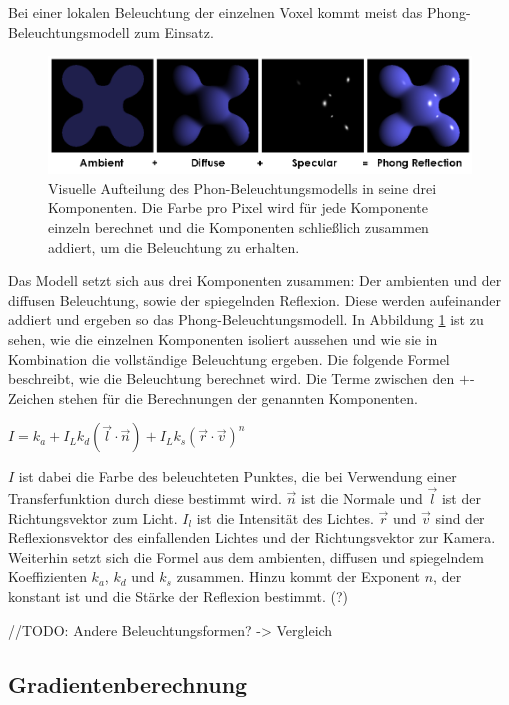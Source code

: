 Bei einer lokalen Beleuchtung der einzelnen Voxel kommt meist das Phong-Beleuchtungsmodell zum Einsatz. 

\begin{figure}
	\centering
	\includegraphics[width=0.7\linewidth]{images/Phong_components_version_4.png}
	\caption{Visuelle Aufteilung des Phon-Beleuchtungsmodells in seine drei Komponenten. Die Farbe pro Pixel wird für jede Komponente einzeln berechnet und die Komponenten schließlich zusammen addiert, um die Beleuchtung zu erhalten. }
	\label{img:phong}
\end{figure}

Das Modell setzt sich aus drei Komponenten zusammen: Der ambienten und der diffusen Beleuchtung, sowie der spiegelnden Reflexion. Diese werden aufeinander addiert und ergeben so das Phong-Beleuchtungsmodell.  In Abbildung \ref{img:phong} ist zu sehen, wie die einzelnen Komponenten isoliert aussehen und wie sie in Kombination die vollständige Beleuchtung ergeben.
Die folgende Formel beschreibt, wie die Beleuchtung berechnet wird. Die Terme zwischen den $+$-Zeichen stehen für die Berechnungen der genannten Komponenten.

$I = k_{a}+I_{L}k_{d}(\vec{l}\cdot\vec{n})+I_{L}k_{s}(\vec{r}\cdot\vec{v})^n$

$I$ ist dabei die Farbe des beleuchteten Punktes, die bei Verwendung einer Transferfunktion durch diese bestimmt wird. $\vec{n}$ ist die Normale und $\vec{l}$ ist der Richtungsvektor zum Licht. $I_{l}$ ist die Intensität des Lichtes. $\vec{r}$ und $\vec{v}$ sind der Reflexionsvektor des einfallenden Lichtes und der Richtungsvektor zur Kamera. Weiterhin setzt sich die Formel aus dem ambienten, diffusen und spiegelndem Koeffizienten $k_{a}$, $k_{d}$ und $k_{s}$ zusammen. Hinzu kommt der Exponent $n$, der konstant ist und die Stärke der Reflexion bestimmt. (?)

\cite{phong75}
//TODO: Andere Beleuchtungsformen? -> Vergleich

\subsection{Gradientenberechnung}


